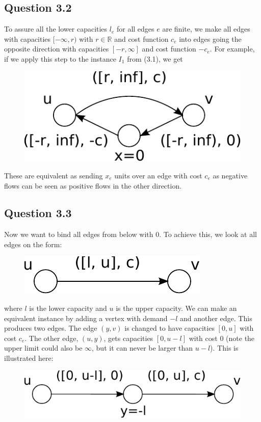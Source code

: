 \documentclass[a4paper]{article}
\begin{document}
\subsection*{Question 3.2}
To assure all the lower capacities $l_e$ for all edges $e$ are finite, we make all edges with capacities $[-\infty, r)$ 
with \(r \in \mathbb{R}\) and cost function $c_e$ into edges going the opposite direction with capacities $[-r, \infty]$ and cost function $-c_e$. For example, if we apply this step to the instance $I_1$ from (3.1), we get
\begin{figure}[H]
\centering
\includegraphics[width=\textwidth / 2]{graphics/fig5.pdf}
\label{fig:ex32fig}
\end{figure}
These are equivalent as sending $x_e$ units over an edge with cost $c_e$ as negative flows can be seen as positive flows in the other direction.

\subsection*{Question 3.3}
Now we want to bind all edges from below with $0$. To achieve this, we look at all edges on the form:
\begin{figure}[H]
\centering
\includegraphics[width=\textwidth / 2]{graphics/fig6.pdf}
\label{fig:ex33figa}
\end{figure}
where $l$ is the lower capacity and $u$ is the upper capacity. We can make an equivalent instance by adding a vertex with demand $-l$ and another edge. This produces two edges. The edge $(y,v)$ is changed to have capacities $[0,u]$ with cost $c_e$. The other edge, $(u,y)$, gets capacities $[0,u-l]$ with cost $0$ (note the upper limit could also be $\infty$, but it can never be larger than $u-l$). This is illustrated here:
\begin{figure}[H]
\centering
\includegraphics[width=\textwidth / 2]{graphics/fig7.pdf}
\label{fig:ex33figb}
\end{figure}
\end{document}
